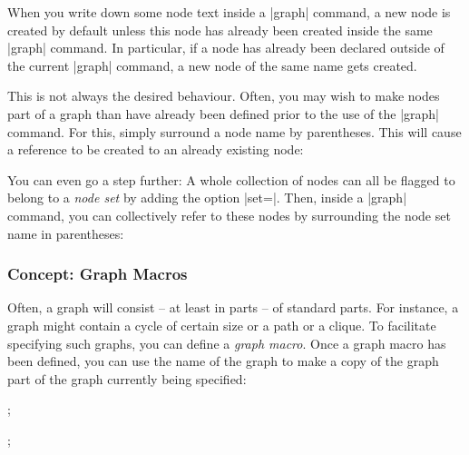 When you write down some node text inside a |graph| command, a new node is
created by default unless this node has already been created inside the same
|graph| command. In particular, if a node has already been declared outside of
the current |graph| command, a new node of the same name gets created.

This is not always the desired behaviour. Often, you may wish to make nodes
part of a graph than have already been defined prior to the use of the |graph|
command. For this, simply surround a node name by parentheses. This will cause
a reference to be created to an already existing node:
%
\begin{codeexample}[]
\end{codeexample}

You can even go a step further: A whole collection of nodes can all be flagged
to belong to a \emph{node set} by adding the option |set=|.
Then, inside a |graph| command, you can collectively refer to these nodes by
surrounding the node set name in parentheses:
%
\begin{codeexample}[]
\end{codeexample}


\subsubsection{Concept: Graph Macros}

Often, a graph will consist -- at least in parts -- of standard parts. For
instance, a graph might contain a cycle of certain size or a path or a clique.
To facilitate specifying such graphs, you can define a \emph{graph macro}. Once
a graph macro has been defined, you can use the name of the graph to make a
copy of the graph part of the graph currently being specified:
%
\begin{codeexample}[]
\tikz {};
\end{codeexample}

\begin{codeexample}[]
\tikz {};
\end{codeexample}

